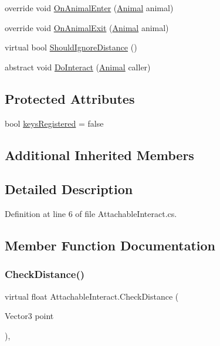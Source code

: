 \begin{DoxyCompactItemize}
override void \mbox{\hyperlink{class_attachable_interact_a376127af23be5456604ee5ec39f02b9b}{On\+Animal\+Enter}} (\mbox{\hyperlink{class_animal}{Animal}} animal)
\item 
override void \mbox{\hyperlink{class_attachable_interact_a072c261c7ec9235f62c441fbac876b8f}{On\+Animal\+Exit}} (\mbox{\hyperlink{class_animal}{Animal}} animal)
\item 
virtual bool \mbox{\hyperlink{class_attachable_interact_adbfe794fcb2bb817dbc62310c43c687e}{Should\+Ignore\+Distance}} ()
\item 
abstract void \mbox{\hyperlink{class_attachable_interact_a9b07a54f1dbb96777c4bd287dfe438e3}{Do\+Interact}} (\mbox{\hyperlink{class_animal}{Animal}} caller)
\end{DoxyCompactItemize}
\subsection*{Protected Attributes}
\begin{DoxyCompactItemize}
\item 
bool \mbox{\hyperlink{class_attachable_interact_a27e2c7faf9280bbc0e52c6360c79daf6}{keys\+Registered}} = false
\end{DoxyCompactItemize}
\subsection*{Additional Inherited Members}


\subsection{Detailed Description}


Definition at line 6 of file Attachable\+Interact.\+cs.



\subsection{Member Function Documentation}
\mbox{\label{class_attachable_interact_aa6b840e4c36f09981e31b2b33bc9d45a}} 
\subsubsection{\texorpdfstring{Check\+Distance()}{CheckDistance()}}
{\footnotesize\ttfamily virtual float Attachable\+Interact.\+Check\+Distance (\begin{DoxyParamCaption}\item[{Vector3}]{point }\end{DoxyParamCaption})\hspace{0.3cm}{\ttfamily [protected]}, {\ttfamily [virtual]}}



